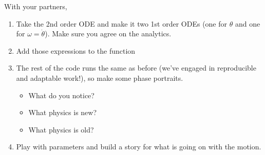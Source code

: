 \documentclass[letterpaper,10pt,english]{jupyterBook}
\begin{document}
\sphinxAtStartPar
With your partners,
\begin{enumerate}
%
\item {} 
\sphinxAtStartPar
Take the 2nd order ODE and make it two 1st order ODEs (one for \(\theta\) and one for \(\omega=\dot{\theta}\)). Make sure you agree on the analytics.

\item {} 
\sphinxAtStartPar
Add those expressions to the function 

\item {} 
\sphinxAtStartPar
The rest of the code runs the same as before (we’ve engaged in reproducible and adaptable work!), so make some phase portraits.
\begin{itemize}
\item {} 
\sphinxAtStartPar
What do you notice?

\item {} 
\sphinxAtStartPar
What physics is new?

\item {} 
\sphinxAtStartPar
What physics is old?

\end{itemize}

\item {} 
\sphinxAtStartPar
Play with parameters and build a story for what is going on with the motion.

\end{enumerate}
\end{document}
